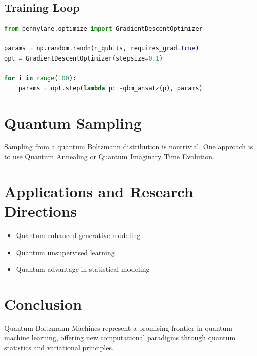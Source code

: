 \documentclass[12pt]{article}
\begin{document}
\subsection{Training Loop}

\begin{lstlisting}[language=Python]
from pennylane.optimize import GradientDescentOptimizer

params = np.random.randn(n_qubits, requires_grad=True)
opt = GradientDescentOptimizer(stepsize=0.1)

for i in range(100):
    params = opt.step(lambda p: -qbm_ansatz(p), params)
\end{lstlisting}

\section{Quantum Sampling}

Sampling from a quantum Boltzmann distribution is nontrivial. One approach is to use Quantum Annealing or Quantum Imaginary Time Evolution.

\section{Applications and Research Directions}

\begin{itemize}
  \item Quantum-enhanced generative modeling
  \item Quantum unsupervised learning
  \item Quantum advantage in statistical modeling
\end{itemize}

\section{Conclusion}

Quantum Boltzmann Machines represent a promising frontier in quantum machine learning, offering new computational paradigms through quantum statistics and variational principles.
\end{document}
